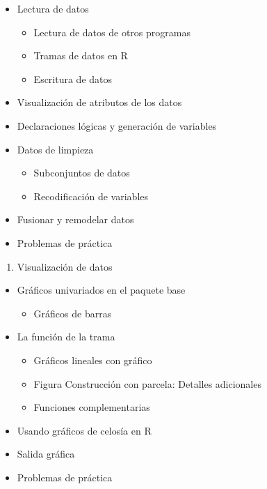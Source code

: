 \documentclass[
]{book}
\providecommand{\tightlist}{%
  \setlength{\itemsep}{0pt}\setlength{\parskip}{0pt}}
\begin{document}
\begin{itemize}
\tightlist
\item
  Lectura de datos

  \begin{itemize}
  \tightlist
  \item
    Lectura de datos de otros programas
  \item
    Tramas de datos en R
  \item
    Escritura de datos
  \end{itemize}
\item
  Visualización de atributos de los datos
\item
  Declaraciones lógicas y generación de variables
\item
  Datos de limpieza

  \begin{itemize}
  \tightlist
  \item
    Subconjuntos de datos
  \item
    Recodificación de variables
  \end{itemize}
\item
  Fusionar y remodelar datos
\item
  Problemas de práctica
\end{itemize}

\begin{enumerate}
\def\labelenumi{\arabic{enumi}.}
\setcounter{enumi}{2}
\tightlist
\item
  Visualización de datos
\end{enumerate}

\begin{itemize}
\tightlist
\item
  Gráficos univariados en el paquete base

  \begin{itemize}
  \tightlist
  \item
    Gráficos de barras
  \end{itemize}
\item
  La función de la trama

  \begin{itemize}
  \tightlist
  \item
    Gráficos lineales con gráfico
  \item
    Figura Construcción con parcela: Detalles adicionales
  \item
    Funciones complementarias
  \end{itemize}
\item
  Usando gráficos de celosía en R
\item
  Salida gráfica
\item
  Problemas de práctica
\end{itemize}
\end{document}
